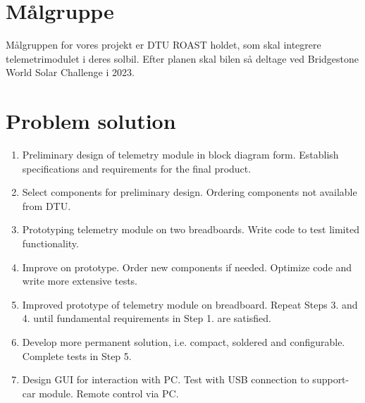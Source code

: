 \documentclass[]{article}
\begin{document}
\section{Målgruppe}
Målgruppen for vores projekt er DTU ROAST holdet, som skal integrere telemetrimodulet i deres solbil. Efter planen skal bilen så deltage ved Bridgestone World Solar Challenge i 2023.

\section{Problem solution}
\begin{enumerate}
    \item Preliminary design of telemetry module in block diagram form. Establish specifications and requirements for the final product. 
    \item Select components for preliminary design. Ordering components not available from DTU. 
    \item Prototyping telemetry module on two breadboards. Write code to test limited functionality. 
    \item Improve on prototype. Order new components if needed. Optimize code and write more extensive tests. 
    \item Improved prototype of telemetry module on breadboard. Repeat Steps 3. and 4. until fundamental requirements in Step 1. are satisfied. 
    \item Develop more permanent solution, i.e. compact, soldered and configurable. Complete tests in Step 5.
    \item Design GUI for interaction with PC. Test with USB connection to support-car module. Remote control via PC. 

\end{enumerate}
\end{document}
